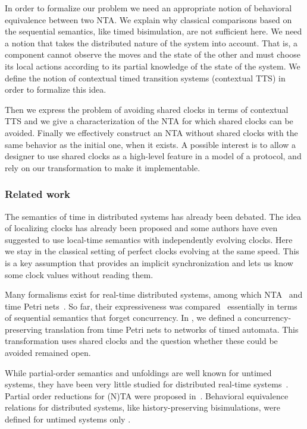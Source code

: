 \documentclass{LMCS}
\theoremstyle{plain}\newtheorem*{prop11}{Proposition~\ref{prop:states} bis}
\begin{document}
In order to formalize our problem we need an appropriate notion of behavioral
equivalence between two NTA\@. We explain why classical comparisons based on the
sequential semantics, like timed bisimulation, are not sufficient here.
We need a notion that takes the distributed nature of the system into account.
That is, a component cannot observe the moves and the state of the other and
must choose its local actions according to its partial knowledge of the state of
the system. We define the notion of contextual timed transition systems
(contextual TTS) in order to formalize this idea.

Then we express the problem of avoiding shared clocks in terms of contextual TTS
and we give a characterization of the NTA for which shared clocks can be avoided.
Finally we effectively construct an NTA without shared clocks with the same
behavior as the initial one, when it exists.
A possible interest is to allow a designer to use shared clocks as a high-level
feature in a model of a protocol, and rely on our transformation to make it
implementable.


\subsubsection*{Related work}

The semantics of time in distributed systems has already been debated. The idea
of localizing clocks has already been proposed and some authors
\cite{ABGMN-concur08,Dima,Bengtsson98partialorder} have even suggested to use
local-time semantics with independently evolving clocks. Here we stay in the
classical setting of perfect clocks evolving at the same speed. This is a key
assumption that provides an implicit synchronization and lets us know some clock
values without reading them.

Many formalisms exist for real-time distributed systems, among which
NTA~\cite{AD94} and time Petri nets~\cite{Merlin}. So far, their
expressiveness was
compared~\cite{BCHRL-FORMATS2005,BoyerR08,Cassez-JSS06,Srba08} essentially in terms of
sequential semantics that forget concurrency. In \cite{BCH-fmsd12}, we defined a
concurrency-preserving translation from time Petri nets to networks of timed
automata. This transformation uses shared clocks and the question whether these
could be avoided remained open.

While partial-order semantics and unfoldings are well known for untimed systems,
they have been very little studied for distributed real-time
systems~\cite{Cassez-Ch-Jard_ATVA06,BHR-atva06}. Partial order reductions for (N)TA were
proposed in~\cite{Minea99,Bengtsson98partialorder,LugiezNZ05}.
Behavioral equivalence relations for distributed systems, like
history-preserving bisimulations, were defined for
untimed systems only \cite{BestDKP91,GlabbeekG01}.
\end{document}
